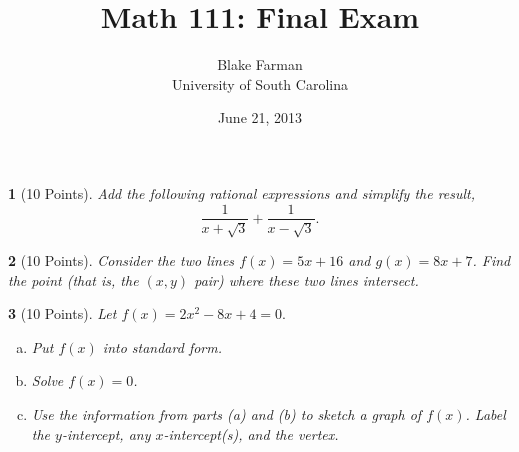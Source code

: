 \documentclass[12pt]{amsart}
\author{Blake Farman\\University of South Carolina}
\title{Math 111: Final Exam}
\date{June 21, 2013}
\begin{document}
\maketitle

\begin{center}
\end{center}

\vspace{0.2in}
\vspace{0.2in}

\theoremstyle{plain}
\newtheorem{thm}{}
\newtheorem{lem}{Lemma}
\theoremstyle{definition}
\newtheorem{defn}{Definition}

\begin{thm}[10 Points]
  Add the following rational expressions and simplify the result,
  $$\frac{1}{x + \sqrt{3}} + \frac{1}{x - \sqrt{3}}.$$
  \vspace{1in}
\end{thm}

\begin{thm}[10 Points]
  Consider the two lines $f(x) = 5x + 16$ and $g(x) = 8x + 7$.
  Find the point (that is, the $(x,y)$ pair) where these two lines intersect.
  \vspace{2in}
\end{thm}

\newpage

\begin{thm}[10 Points]
  Let $f(x) = 2x^2 - 8x + 4 = 0.$
  \begin{enumerate}[(a)]
  \item
    Put $f(x)$ into standard form.
    \vspace{1in}
  \item
    Solve $f(x) = 0$.
    \vspace{1in}
  \item
    Use the information from parts (a) and (b) to sketch a graph of $f(x)$.
    Label the $y$-intercept, any $x$-intercept(s), and the vertex.
    \vspace{2in}
  \end{enumerate}
\end{thm}
\end{document}

